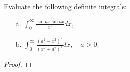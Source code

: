 \begin{problem}{6}
  Evaluate the following definite integrals:
  \begin{enumerate}
    \item[a.] $\displaystyle \int_0^\infty \frac{\sin ax \sin bx}{x^2} dx,$
    \item[b.] $\displaystyle \int_0^\infty \frac{(a^2 - x^2)^2}{(x^2+a^2)^4} dx, \quad a >0$.
  \end{enumerate}
\end{problem}

\begin{proof}
\end{proof}
\newpage
